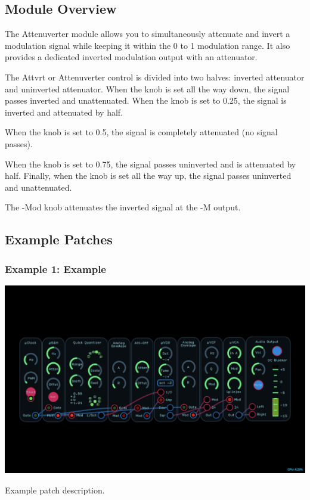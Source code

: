 \documentclass[11pt]{book}
\begin{document}
\begin{multicols*}{2}

\subsection*{Module Overview}

The Attenuverter module allows you to simultaneously attenuate and invert a modulation signal while keeping it within the 0 to 1 modulation range. It also provides a dedicated inverted modulation output with an attenuator.

The Attvrt or Attenuverter control is divided into two halves: inverted attenuator and uninverted attenuator. When the knob is set all the way down, the signal passes inverted and unattenuated. When the knob is set to 0.25, the signal is inverted and attenuated by half. 

When the knob is set to 0.5, the signal is completely attenuated (no signal passes). 

When the knob is set to 0.75, the signal passes uninverted and is attenuated by half. Finally, when the knob is set all the way up, the signal passes uninverted and unattenuated.

The -Mod knob attenuates the inverted signal at the -M output. 

\subsection*{Example Patches}

\subsubsection*{Example 1: Example}

\begin{center}
\includegraphics[width=0.95\linewidth]{attenuate-offset-fig4.png}
\end{center}

Example patch description.

\end{multicols*}
\end{document}
